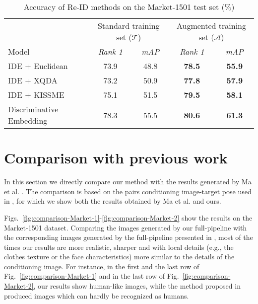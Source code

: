 \documentclass[10pt,twocolumn,letterpaper]{article}
\begin{document}
\begin{table*}[h]
\caption{Accuracy of Re-ID methods  on the Market-1501 test set ($\%$)}
\centering
\begin{tabular}{l|cc|cc}
  \hline
  &\multicolumn{2}{c|}{Standard training set ($\mathcal{T}$)}&\multicolumn{2}{c}{Augmented training set ($\mathcal{A}$)}\\
 Model &\emph{Rank 1} & \emph{mAP} & \emph{Rank 1} & \emph{mAP} \\
\hline
IDE + Euclidean \cite{DBLP:journals/corr/ZhengYH16}    &  73.9  &  48.8 &  \bf 78.5 & \bf 55.9  \\
IDE + XQDA \cite{DBLP:journals/corr/ZhengYH16}           &  73.2  &  50.9  & \bf  77.8 & \bf 57.9  \\
IDE + KISSME \cite{DBLP:journals/corr/ZhengYH16}        &  75.1  &  51.5 &  \bf 79.5 & \bf 58.1  \\
Discriminative Embedding \cite{DBLP:journals/tomccap/ZhengZY18}  &  78.3  &  55.5  &  \bf 80.6 & \bf 61.3  \\
\hline
\end{tabular}
\label{tab:Re-ID}
\end{table*} 
 
 
 
 
\section{Comparison with previous work}
\label{app.comparison}

In this section we directly compare our method with the results generated by Ma et al. \cite{ma2017pose}. The comparison is based on  the pairs conditioning image-target pose used in \cite{ma2017pose}, for which we show both the results obtained by Ma et al. \cite{ma2017pose} and ours.

Figs.~\ref{fig:comparison-Market-1}-\ref{fig:comparison-Market-2} show the results on the Market-1501 dataset. Comparing the images generated by our full-pipeline with the corresponding images generated by the full-pipeline presented in \cite{ma2017pose}, most of the times our results are more realistic, sharper and with local details (e.g., the clothes  texture or the face characteristics) more similar to the details of the conditioning image. 
For instance, in the first and the last row of Fig.~\ref{fig:comparison-Market-1} and in the last row of Fig.~\ref{fig:comparison-Market-2}, our results show  human-like images, while the method proposed in 
\cite{ma2017pose} produced images which can hardly be  recognized as humans.
\end{document}
